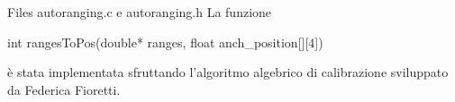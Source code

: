 \begin{frame}[fragile]{Files autoranging.c e autoranging.h}
  La funzione
  \begin{C}
    int rangesToPos(double* ranges, float anch_position[][4])
  \end{C}
  è stata implementata sfruttando l'algoritmo algebrico di calibrazione sviluppato da Federica Fioretti.
\end{frame}
